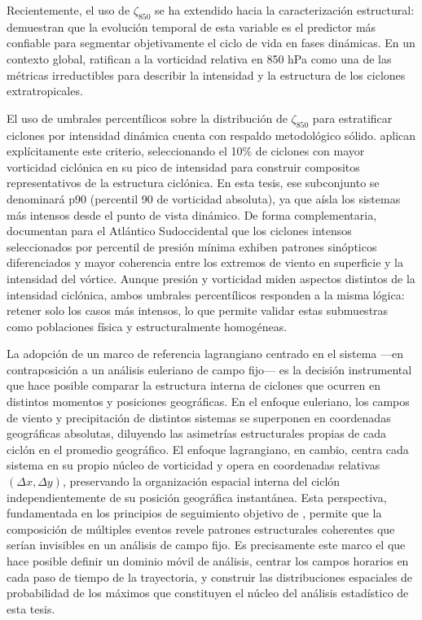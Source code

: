 Recientemente, el uso de $\zeta_{850}$ se ha extendido hacia la caracterización estructural: \citet{coutodesouza2024new} demuestran que la evolución temporal de esta variable es el predictor más confiable para segmentar objetivamente el ciclo de vida en fases dinámicas. En un contexto global, \citet{corner2025classification} ratifican a la vorticidad relativa en 850 hPa como una de las métricas irreductibles para describir la intensidad y la estructura de los ciclones extratropicales.

El uso de umbrales percentílicos sobre la distribución de $\zeta_{850}$ para estratificar ciclones por intensidad dinámica cuenta con respaldo metodológico sólido. \citet{priestley2022improved} aplican explícitamente este criterio, seleccionando el 10\% de ciclones con mayor vorticidad ciclónica en su pico de intensidad para construir compositos representativos de la estructura ciclónica. En esta tesis, ese subconjunto se denominará p90 (percentil 90 de vorticidad absoluta), ya que aísla los sistemas más intensos desde el punto de vista dinámico. De forma complementaria, \citet{andrade2024composite} documentan para el Atlántico Sudoccidental que los ciclones intensos seleccionados por percentil de presión mínima exhiben patrones sinópticos diferenciados y mayor coherencia entre los extremos de viento en superficie y la intensidad del vórtice. Aunque presión y vorticidad miden aspectos distintos de la intensidad ciclónica, ambos umbrales percentílicos responden a la misma lógica: retener solo los casos más intensos, lo que permite validar estas submuestras como poblaciones física y estructuralmente homogéneas.

La adopción de un marco de referencia lagrangiano centrado en el sistema —en contraposición a un análisis euleriano de campo fijo— es la decisión instrumental que hace posible comparar la estructura interna de ciclones que ocurren en distintos momentos y posiciones geográficas. En el enfoque euleriano, los campos de viento y precipitación de distintos sistemas se superponen en coordenadas geográficas absolutas, diluyendo las asimetrías estructurales propias de cada ciclón en el promedio geográfico. El enfoque lagrangiano, en cambio, centra cada sistema en su propio núcleo de vorticidad y opera en coordenadas relativas $(\Delta x, \Delta y)$, preservando la organización espacial interna del ciclón independientemente de su posición geográfica instantánea. Esta perspectiva, fundamentada en los principios de seguimiento objetivo de \citet{sinclair1994objective}, permite que la composición de múltiples eventos revele patrones estructurales coherentes que serían invisibles en un análisis de campo fijo. Es precisamente este marco el que hace posible definir un dominio móvil de análisis, centrar los campos horarios en cada paso de tiempo de la trayectoria, y construir las distribuciones espaciales de probabilidad de los máximos que constituyen el núcleo del análisis estadístico de esta tesis.

